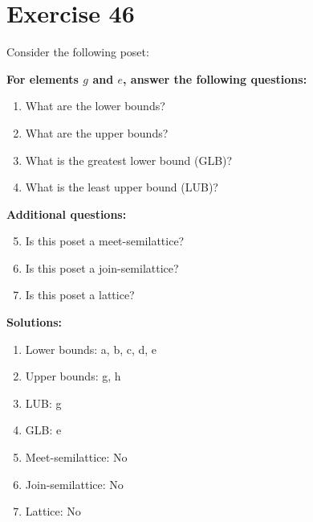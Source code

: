 \documentclass{article}
\begin{document}
\section*{Exercise 46}
Consider the following poset:
\begin{center}
\end{center}

    \textbf{For elements $g$ and $e$, answer the following questions:}
\begin{enumerate}
    \item What are the lower bounds?
    \item What are the upper bounds?
    \item What is the greatest lower bound (GLB)?
    \item What is the least upper bound (LUB)?
\end{enumerate}
    \hspace*{3ex} \textbf{Additional questions:}
\begin{enumerate}
    \setcounter{enumi}{4}
    \item Is this poset a meet-semilattice?
    \item Is this poset a join-semilattice?
    \item Is this poset a lattice?
\end{enumerate}

\textbf{Solutions:}
\begin{enumerate}
    \item Lower bounds: {a, b, c, d, e}
    \item Upper bounds: {g, h}
    \item LUB: g
    \item GLB: e
    \item Meet-semilattice: No
    \item Join-semilattice: No
    \item Lattice: No
\end{enumerate}
\newpage
\end{document}
